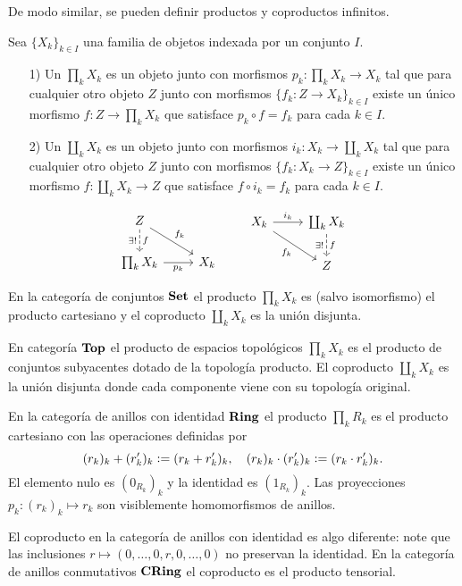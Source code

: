 \documentclass{article}
\numberwithin{equation}{section}
\theoremstyle{definition}
\begin{document}
De modo similar, se pueden definir productos y coproductos infinitos.

\begin{definicion}
  Sea $\{ X_k \}_{k \in I}$ una familia de objetos indexada por un conjunto $I$.

  \begin{enumerate}
  \item[1)] Un  $\prod_k X_k$ es un objeto junto con morfismos
    $p_k\colon \prod_k X_k \to X_k$ tal que para cualquier otro objeto $Z$ junto
    con morfismos $\{ f_k\colon Z\to X_k \}_{k\in I}$ existe un único morfismo
    $f\colon Z \to \prod_k X_k$ que satisface $p_k\circ f = f_k$ para cada
    $k\in I$.

  \item[2)] Un  $\coprod_k X_k$ es un objeto junto con
    morfismos $i_k\colon X_k\to \coprod_k X_k$ tal que para cualquier otro
    objeto $Z$ junto con morfismos $\{ f_k\colon X_k\to Z \}_{k\in I}$ existe un
    único morfismo $f\colon \coprod_k X_k \to Z$ que satisface
    $f\circ i_k = f_k$ para cada $k\in I$.
  \end{enumerate}

  \[ \begin{tikzcd}
      Z \ar{dr}{f_k}\ar[dashed]{d}[swap]{\exists !}{f} \\
      \prod_k X_k\ar{r}[swap]{p_k} & X_k
    \end{tikzcd} \quad\quad \begin{tikzcd}
      X_k\ar{r}{i_k}\ar{dr}[swap]{f_k} & \coprod_k X_k\ar[dashed]{d}[swap]{\exists !}{f} \\
      & Z
    \end{tikzcd} \]
\end{definicion}

\begin{ejemplo}
  En la categoría de conjuntos $\text{\bf Set}$ el producto $\prod_k X_k$ es (salvo
  isomorfismo) el producto cartesiano y el coproducto $\coprod_k X_k$ es
  la unión disjunta.

  En categoría $\text{\bf Top}$ el producto de espacios topológicos $\prod_k X_k$
  es el producto de conjuntos subyacentes dotado de la topología producto.
  El coproducto $\coprod_k X_k$ es la unión disjunta donde cada componente viene
  con su topología original.
\end{ejemplo}

\begin{ejemplo}
  En la categoría de anillos con identidad $\text{\bf Ring}$ el producto
  $\prod_k R_k$ es el producto cartesiano con las operaciones definidas por
  \[ (r_k)_k + (r'_k)_k \mathrel{\mathop:}= (r_k+r'_k)_k, \quad
     (r_k)_k \cdot (r'_k)_k \mathrel{\mathop:}= (r_k\cdot r'_k)_k. \]
  El elemento nulo es $(0_{R_k})_k$ y la identidad es $(1_{R_k})_k$. Las
  proyecciones $p_k\colon (r_k)_k \mapsto r_k$ son visiblemente homomorfismos de
  anillos.

  El coproducto en la categoría de anillos con identidad es algo diferente: note
  que las inclusiones $r \mapsto (0,\ldots,0,r,0,\ldots,0)$ no preservan
  la identidad. En la categoría de anillos conmutativos $\text{\bf CRing}$
  el coproducto es el producto tensorial.
\end{ejemplo}
\end{document}

